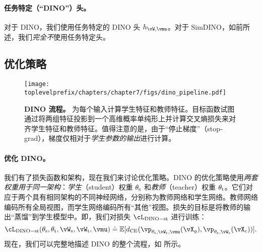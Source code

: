 \documentclass[../../book-main_zh.tex]{subfiles}
\begin{document}
\paragraph{任务特定（“DINO”）头。} 对于 DINO，我们使用任务特定的 DINO 头 \(h_{\vW, \vmu}\)。对于 SimDINO，如前所述，我们\textit{完全不}使用任务特定头。

\subsection{优化策略}\label{sub:contrastive_learning_optimization}

\begin{figure}
    \centering 
    \texttt{[image: \\toplevelprefix/chapters/chapter7/figs/dino\_pipeline.pdf]}
    \caption{\small \textbf{DINO 流程。} 为每个输入计算学生特征和教师特征。目标函数试图通过将两组特征投影到一个高维概率单纯形上并计算交叉熵损失来对齐学生特征和教师特征。值得注意的是，由于“停止梯度”（stop-grad），梯度仅相对于\textit{学生参数的输出}进行计算。}
    \label{fig:dino_pipeline}
\end{figure}

\paragraph{优化 DINO。} 我们有了损失函数和架构，现在我们来讨论优化策略。DINO 的优化策略使用\textit{两套权重用于同一架构}：\textit{学生}（student）权重 \(\theta_{\mathrm{s}}\) 和\textit{教师}（teacher）权重 \(\theta_{\mathrm{t}}\)。它们对应于两个具有相同架构的不同神经网络，分别称为教师网络和学生网络。教师网络编码所有全局视图，而学生网络编码所有“其他”视图。损失的目标是将教师的输出“蒸馏”到学生模型中。即，我们对损失 \(\cL_{\dino{}-\student\teacher}\) 进行训练：
\begin{equation}\label{eq:dino_loss_teacherstudent}
    \cL_{\dino{}-\student\teacher}(\theta_{\student}, \theta_{\teacher}, \vW_{\student}, \vW_{\teacher}, \vmu) \doteq \Ex[d_{\CE}(\vp_{\theta_{\teacher}, \vW_{\teacher}, \vmu}(\vX_{g}), \vp_{\theta_{\student}, \vW_{\student}}(\vX_{c}))].
\end{equation}
现在，我们可以完整地描述 DINO 的整个流程，如  所示。
\end{document}
